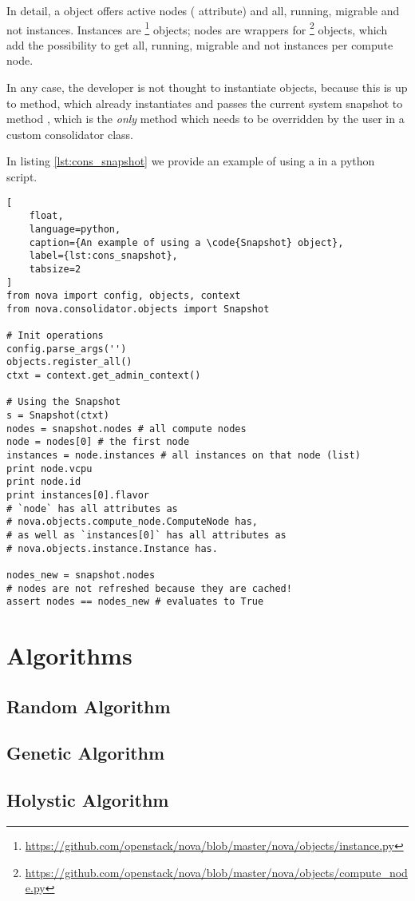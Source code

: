 In detail, a  object offers active nodes ( attribute) and all, running, migrable and not instances. Instances are \footnote{\url{https://github.com/openstack/nova/blob/master/nova/objects/instance.py}} objects; nodes are wrappers for \footnote{\url{https://github.com/openstack/nova/blob/master/nova/objects/compute_node.py}} objects, which add the possibility to get all, running, migrable and not instances per compute node.

In any case, the developer is not thought to instantiate  objects, because this is up to  method, which already instantiates and passes the current system snapshot to method , which is the \emph{only} method which needs to be overridden by the user in a custom consolidator class.

In listing \ref{lst:cons_snapshot} we provide an example of using a  in a python script.

\begin{lstlisting}[
	float,
	language=python,
	caption={An example of using a \code{Snapshot} object},
	label={lst:cons_snapshot},
	tabsize=2
]
from nova import config, objects, context
from nova.consolidator.objects import Snapshot

# Init operations
config.parse_args('')
objects.register_all()
ctxt = context.get_admin_context()

# Using the Snapshot
s = Snapshot(ctxt)
nodes = snapshot.nodes # all compute nodes
node = nodes[0] # the first node
instances = node.instances # all instances on that node (list)
print node.vcpu
print node.id
print instances[0].flavor
# `node` has all attributes as
# nova.objects.compute_node.ComputeNode has,
# as well as `instances[0]` has all attributes as
# nova.objects.instance.Instance has.

nodes_new = snapshot.nodes
# nodes are not refreshed because they are cached!
assert nodes == nodes_new # evaluates to True
\end{lstlisting}

\section{Algorithms}
\label{sec:cons_algs}

\subsection{Random Algorithm}
\label{sub:algs_rnd}

\subsection{Genetic Algorithm}
\label{sub:algs_rnd}

\subsection{Holystic Algorithm}
\label{sub:algs_rnd}